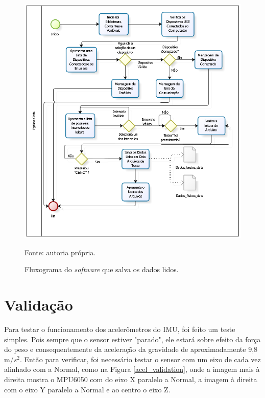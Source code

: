 		\begin{figure}[h]
			\centering
			\includegraphics[keepaspectratio=true,scale=1]{figuras/diagrama_python.PNG}
			\caption{Fluxograma do \textit{software} que salva os dados lidos. }
			Fonte: autoria própria. 
			\label{fluxograma_python}	
		\end{figure}
		
\section {Validação}

	Para testar o funcionamento dos acelerômetros do IMU, foi feito um teste simples. Pois sempre que o sensor estiver "parado", ele estará sobre efeito da força do peso e consequentemente da aceleração da gravidade de aproximadamente 9,8 m/$ s^2 $. Então para verificar, foi necessário testar o sensor com um eixo de cada vez alinhado com a Normal, como na Figura \ref{acel_validation}, onde a imagem mais à direita mostra o MPU6050 com do eixo X paralelo a Normal, a imagem à direita com o eixo Y paralelo a Normal e ao centro o eixo Z.
	
